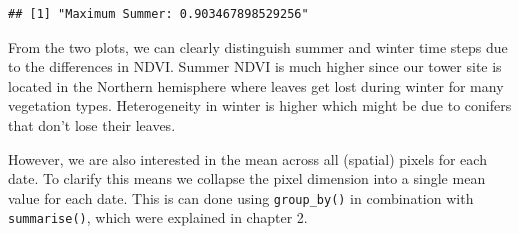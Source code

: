 \documentclass[
]{book}
\newenvironment{Shaded}{\begin{snugshade}}{\end{snugshade}}
\newcommand{\CommentTok}[1]{\textcolor[rgb]{0.56,0.35,0.01}{\textit{#1}}}
\newcommand{\DataTypeTok}[1]{\textcolor[rgb]{0.13,0.29,0.53}{#1}}
\newcommand{\KeywordTok}[1]{\textcolor[rgb]{0.13,0.29,0.53}{\textbf{#1}}}
\newcommand{\NormalTok}[1]{#1}
\newcommand{\OperatorTok}[1]{\textcolor[rgb]{0.81,0.36,0.00}{\textbf{#1}}}
\newcommand{\StringTok}[1]{\textcolor[rgb]{0.31,0.60,0.02}{#1}}
\begin{document}
\begin{verbatim}
## [1] "Maximum Summer: 0.903467898529256"
\end{verbatim}

From the two plots, we can clearly distinguish summer and winter time steps due to the differences in NDVI. Summer NDVI is much higher since our tower site is located in the Northern hemisphere where leaves get lost during winter for many vegetation types. Heterogeneity in winter is higher which might be due to conifers that don't lose their leaves.

However, we are also interested in the mean across all (spatial) pixels for each date. To clarify this means we collapse the pixel dimension into a single mean value for each date. This is can done using \texttt{group\_by()} in combination with \texttt{summarise()}, which were explained in chapter 2.

\begin{Shaded}
\end{Shaded}
\end{document}
